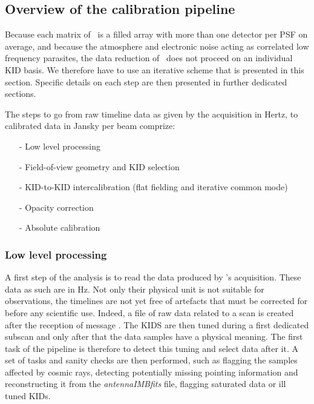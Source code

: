 \subsection{Overview of the calibration pipeline}

Because each matrix of \nika\ is a filled array with more than one detector per
PSF on average, and because the atmosphere and electronic noise acting as
correlated low frequency parasites, the data reduction of \nika\ does not
proceed on an individual KID basis. We therefore have to use an iterative scheme
that is presented in this section. Specific details on each step are then
presented in further dedicated sections.


The steps to go from raw timeline data as given by the acquisition in Hertz, to
calibrated data in Jansky per beam comprize:

\begin{itemize}
\item[-] Low level processing
\item[-] Field-of-view geometry and KID selection
\item[-] KID-to-KID intercalibration (flat fielding and iterative common mode)
\item[-] Opacity correction
\item[-] Absolute calibration
\end{itemize}

\subsubsection{Low level processing}

A first step of the analysis is to read the data produced by \nika's
acquisition. These data as such are in Hz. Not only their physical unit is not
suitable for observations, the timelines are not yet free of artefacts that must
be corrected for before any scientific use. Indeed, a file of raw data related
to a scan is created after the reception of message . The KIDS are then tuned during a first
dedicated subscan and only after that the data samples have a physical
meaning. The first task of the pipeline is therefore to detect this tuning and
select data after it. A set of tasks and sanity checks are then performed, such
as flagging the samples affected by cosmic rays, detecting potentially missing
pointing information and reconstructing it from the \emph{antennaIMBfits} file,
flagging saturated data or ill tuned KIDs.\\

